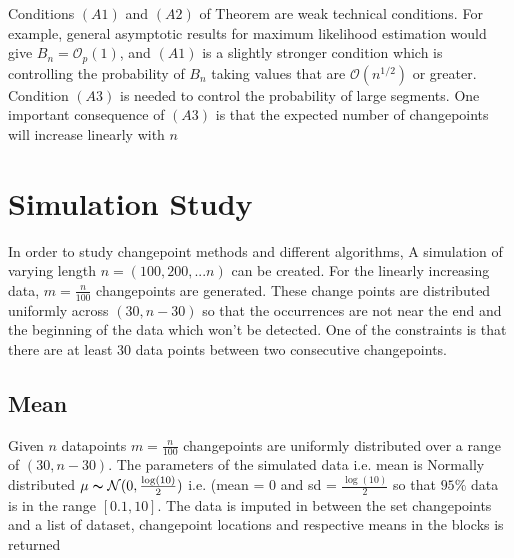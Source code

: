 \documentclass{article}
\begin{document}
Conditions $(A1)$ and $(A2)$ of Theorem are weak technical conditions. For example, general asymptotic results for maximum likelihood estimation would give $B_{n} = \mathcal{O}_{p}(1)$, and $(A1)$ is a slightly stronger condition which is controlling the probability of $B_{n}$ taking values that are $\mathcal{O}(n^{1/2})$ or greater.\\
Condition $(A3)$ is needed to control the probability of large segments. One important consequence of $(A3)$ is that the expected number of changepoints will increase linearly with $n$\\
\clearpage
\section{Simulation Study}
In order to study changepoint methods and different algorithms, A simulation of varying length $n = (100,200,...n)$ can be created. For the linearly increasing data, $m = \frac{n}{100}$ changepoints are generated. These change points are distributed uniformly across $(30,n-30)$ so that the occurrences are not near the end and the beginning of the data which won't be detected. One of the constraints is that there are at least 30 data points between two consecutive changepoints. 

\subsection{Mean}
Given $n$ datapoints $m = \frac{n}{100}$ changepoints are uniformly distributed over a range of $(30,n-30)$.  
The parameters of the simulated data i.e. mean is Normally distributed $\mu \thicksim \mathcal{N}(0,\frac{\log(10)}{2})$ i.e. (mean = 0 and sd = $\frac{\log(10)}{2}$ so that $95\%$ data is in the range $[0.1,10]$. The data is imputed in between the set changepoints and a list of dataset, changepoint locations and respective means in the blocks is returned 
\end{document}
